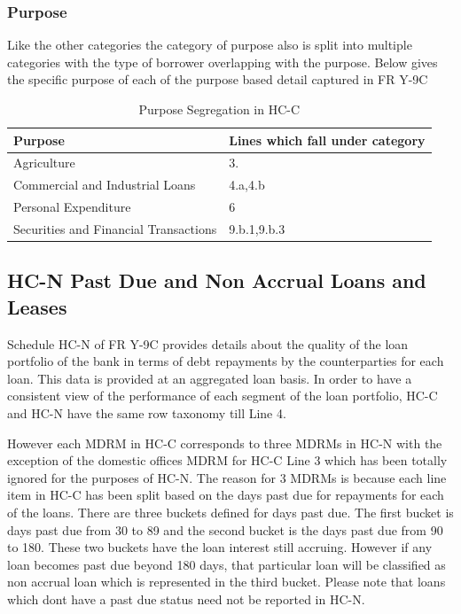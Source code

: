 \documentclass[conference]{IEEEtran}
\begin{document}
        \subsubsection{Purpose}
             Like the other categories the category of purpose also is split into multiple categories with the type of borrower overlapping with the purpose. Below gives the specific purpose of each of the purpose based detail captured in FR Y-9C
             \begin{table}[htbp]
             	\centering
             	\caption{Purpose Segregation in HC-C}
             	\begin{tabular}{|p{3.5cm}|p{4cm}|}
             		\hline
             		\textbf{Purpose} & \textbf{Lines which fall under category} \\
             		\hline
             		Agriculture & 3. \\
             		\hline
             		Commercial and Industrial Loans & 4.a,4.b \\
             		\hline
             		Personal Expenditure & 6 \\
             		\hline
             		Securities and Financial Transactions & 9.b.1,9.b.3\\
             		\hline
             	\end{tabular}
             \end{table}
            		
\subsection{HC-N Past Due and Non Accrual Loans and Leases}
	Schedule HC-N of FR Y-9C provides details about the quality of the loan portfolio of the bank in terms of debt repayments by the counterparties for each loan. This data is provided at an aggregated loan basis. In order to have a consistent view of the performance of each segment of the loan portfolio, HC-C and HC-N have the same row taxonomy till Line 4. 
	
	However each MDRM in HC-C corresponds to three MDRMs in HC-N with the exception of the domestic offices MDRM for HC-C Line 3 which has been totally ignored for the purposes of HC-N. The reason for 3 MDRMs is because each line item in HC-C has been split based on the days past due for repayments for each of the loans. There are three buckets defined for days past due. The first bucket is days past due from 30 to 89 and the second bucket is the days past due from 90 to 180. These two buckets have the loan interest still accruing. However if any loan becomes past due beyond 180 days, that particular loan will be classified as non accrual loan which is represented in the third bucket. Please note that loans which dont have a past due status need not be reported in HC-N.
	
\end{document}
